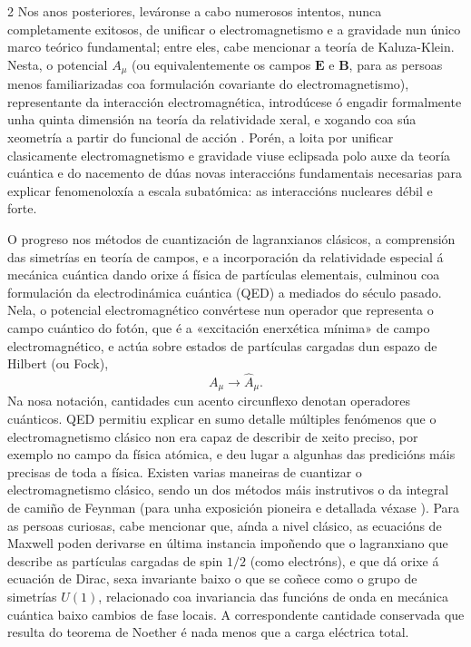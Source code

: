 \begin{multicols}{2}
Nos anos posteriores, leváronse a cabo numerosos intentos, nunca completamente
exitosos, de unificar o electromagnetismo e a gravidade nun único marco teórico
fundamental; entre eles, cabe mencionar a teoría de Kaluza-Klein. Nesta, o
potencial $A_\mu$ (ou equivalentemente os campos $\textbf{E}$ e $\textbf{B}$,
para as persoas menos familiarizadas coa formulación covariante do electromagnetismo), %
representante da interacción electromagnética, introdúcese ó engadir
formalmente unha quinta dimensión na teoría da relatividade xeral, e xogando
coa súa xeometría a partir do funcional de acción \cite{KaluzaTh}. Porén, a
loita por unificar clasicamente electromagnetismo e gravidade viuse eclipsada
polo auxe da teoría cuántica e do nacemento de dúas novas interaccións
fundamentais necesarias para explicar fenomenoloxía a escala subatómica: as
interaccións nucleares débil e forte.

O progreso nos métodos de cuantización de lagranxianos clásicos, a comprensión
das simetrías en teoría de campos, e a incorporación da relatividade especial á
mecánica cuántica dando orixe á física de partículas elementais, culminou coa
formulación da electrodinámica cuántica (QED) a mediados do século pasado.
Nela, o potencial electromagnético convértese nun operador que representa o
campo cuántico do fotón, que é a «excitación enerxética mínima» de campo
electromagnético, e actúa sobre estados de partículas cargadas dun espazo de
Hilbert (ou Fock),
%
\begin{equation}
    A_\mu \to \hat{A}_\mu.
\end{equation}
%
Na nosa notación, cantidades cun acento circunflexo denotan operadores
cuánticos. QED permitiu explicar en sumo detalle múltiples fenómenos que o
electromagnetismo clásico non era capaz de describir de xeito preciso, por
exemplo no campo da física atómica, e deu lugar a algunhas das predicións máis
precisas de toda a física. Existen varias maneiras de cuantizar o
electromagnetismo clásico, sendo un dos métodos máis instrutivos o da integral
de camiño de Feynman (para unha exposición pioneira e detallada véxase
\cite{FH}). Para as persoas curiosas, cabe mencionar que, aínda a  %
nivel clásico, as ecuacións de Maxwell poden derivarse en última instancia
impoñendo que o lagranxiano que describe as partículas cargadas de spin $1/2$
(como electróns), e que dá orixe á ecuación de Dirac, sexa invariante baixo o
que se coñece como o grupo de simetrías $U(1)$, relacionado coa invariancia das
funcións de onda en mecánica cuántica baixo cambios de fase locais. A
correspondente cantidade conservada que resulta do teorema de Noether é nada
menos que a carga eléctrica total.


\end{multicols}
